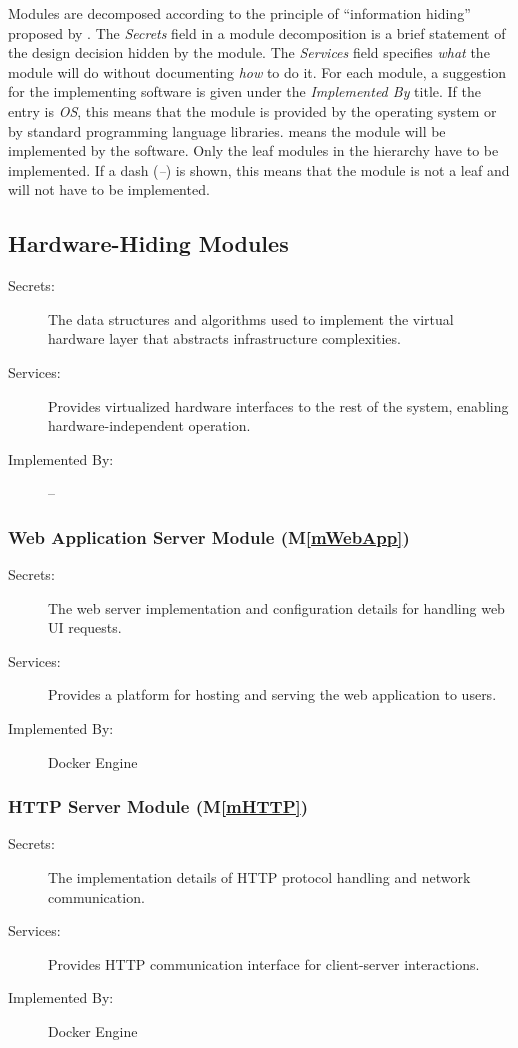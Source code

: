 \documentclass[12pt, titlepage]{article}
\newcommand{\mref}[1]{M\ref{#1}}
\begin{document}
Modules are decomposed according to the principle of ``information hiding''
proposed by \citet{ParnasEtAl1984}. The \emph{Secrets} field in a module
decomposition is a brief statement of the design decision hidden by the
module. The \emph{Services} field specifies \emph{what} the module will do
without documenting \emph{how} to do it. For each module, a suggestion for the
implementing software is given under the \emph{Implemented By} title. If the
entry is \emph{OS}, this means that the module is provided by the operating
system or by standard programming language libraries.  \emph{\progname{}} means the
module will be implemented by the \progname{} software.
\newline
Only the leaf modules in the hierarchy have to be implemented. If a dash
(\emph{--}) is shown, this means that the module is not a leaf and will not have
to be implemented.

\subsection{Hardware-Hiding Modules}
\begin{description}
\item[Secrets:] The data structures and algorithms used to implement the virtual hardware layer that abstracts infrastructure complexities.
\item[Services:] Provides virtualized hardware interfaces to the rest of the system, enabling hardware-independent operation.
\item[Implemented By:] --
\end{description}

\subsubsection{Web Application Server Module (\mref{mWebApp})}
\begin{description}
\item[Secrets:] The web server implementation and configuration details for handling web UI requests.
\item[Services:] Provides a platform for hosting and serving the web application to users.
\item[Implemented By:] Docker Engine
\end{description}

\subsubsection{HTTP Server Module (\mref{mHTTP})}
\begin{description}
\item[Secrets:] The implementation details of HTTP protocol handling and network communication.
\item[Services:] Provides HTTP communication interface for client-server interactions.
\item[Implemented By:] Docker Engine
\end{description}
\end{document}
